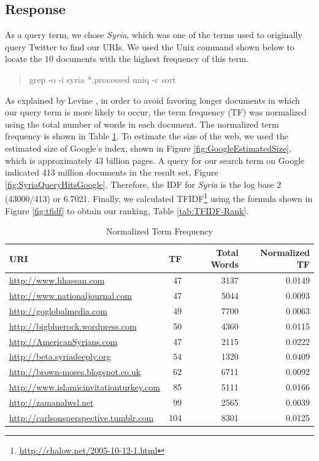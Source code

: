 \documentclass[letterpaper,11pt]{report}
\begin{document}
\begin{savenotes}
\subsection{Response} As a query term, we chose \emph{Syria}, which was one of the terms used to originally query Twitter to find our URIs. We used the Unix command shown below to locate the 10 documents with the highest frequency of this term. \begin{quote}grep -o -i syria *.processed  uniq -c  sort\end{quote} As explained by Levine \cite{levene2011introduction}, in order to avoid favoring longer documents in which our query term is more likely to occur, the term frequency (TF) was normalized using the total number of words in each document. The normalized term frequency is shown in Table \ref{tab:NormalizedTermFrequency}. To estimate the size of the web, we used the estimated size of Google's index, shown in Figure \ref{fig:GoogleEstimatedSize}, which is approximately 43 billion pages. A query for our search term on Google indicated 413 million documents in the result set, Figure \ref{fig:SyriaQueryHitsGoogle}. Therefore, the IDF for \emph{Syria} is the log base 2 (43000/413) or 6.7021. Finally, we calculated TFIDF\footnote{\url{http://chalow.net/2005-10-12-1.html}} using the formula shown in Figure \ref{fig:tfidf} to obtain our ranking, Table \ref{tab:TFIDF-Rank}.

\begin{table}[htbp]
	\centering
    \begin{tabular}{|l|r|r|r|}
    \hline
    URI                            & TF  & Total Words & Normalized TF \\ \hline
    \url{http://www.hhassan.com}                & 47  & 3137        & 0.0149        \\ \hline
    \url{http://www.nationaljournal.com}        & 47  & 5044        & 0.0093        \\ \hline
    \url{http://goglobalmedia.com}              & 49  & 7700        & 0.0063        \\ \hline
    \url{http://bigbluerock.wordpress.com }     & 50  & 4360        & 0.0115        \\ \hline
    \url{http://AmericanSyrians.com}            & 47  & 2115        & 0.0222        \\ \hline
    \url{http://beta.syriadeeply.org}           & 54  & 1320        & 0.0409        \\ \hline
    \url{http://brown-moses.blogspot.co.uk}     & 62  & 6711        & 0.0092        \\ \hline
    \url{http://www.islamicinvitationturkey.com}    & 85  & 5111        & 0.0166        \\ \hline
    \url{http://zamanalwsl.net}                 & 99  & 2565        & 0.0039        \\ \hline
    \url{http://carlsonsperspective.tumblr.com} & 104 & 8301        & 0.0125        \\ \hline
		\end{tabular}
	\caption{Normalized Term Frequency}
	\label{tab:NormalizedTermFrequency}
\end{table}


\end{savenotes}
\end{document}
